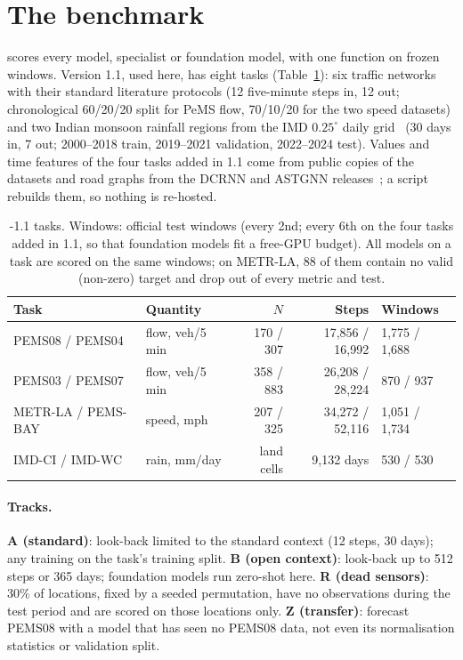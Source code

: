 \section{The \benchname{} benchmark}
\label{sec:bench}

\benchname{} scores every model, specialist or foundation model, with one function on frozen windows. Version
1.1, used here, has eight tasks (Table~\ref{tab:tasks}): six traffic networks with their standard literature
protocols (12 five-minute steps in, 12 out; chronological 60/20/20 split for PeMS flow, 70/10/20 for the two
speed datasets) and two Indian monsoon rainfall regions from the IMD $0.25^\circ$ daily grid~\citep{nandi2024imdlib}
(30 days in, 7 out; 2000--2018 train, 2019--2021 validation, 2022--2024 test). Values and time features of the
four tasks added in 1.1 come from public copies of the datasets and road graphs from the DCRNN and ASTGNN
releases~\citep{li2018dcrnn,guo2019astgcn}; a script rebuilds them, so nothing is re-hosted.

\begin{table}[t]
\caption{\benchname{}-1.1 tasks. Windows: official test windows (every 2nd; every 6th on the four tasks added in
1.1, so that foundation models fit a free-GPU budget). All models on a task are scored on the same windows; on METR-LA, 88 of them contain no valid (non-zero) target
and drop out of every metric and test.}
\label{tab:tasks}
\scriptsize
\setlength{\tabcolsep}{3pt}
\begin{tabular}{@{}llrrl@{}}
\toprule
Task & Quantity & $N$ & Steps & Windows \\
\midrule
PEMS08 / PEMS04 & flow, veh/5 min & 170 / 307 & 17,856 / 16,992 & 1,775 / 1,688 \\
PEMS03 / PEMS07 & flow, veh/5 min & 358 / 883 & 26,208 / 28,224 & 870 / 937 \\
METR-LA / PEMS-BAY & speed, mph & 207 / 325 & 34,272 / 52,116 & 1,051 / 1,734 \\
IMD-CI / IMD-WC & rain, mm/day & land cells & 9,132 days & 530 / 530 \\
\bottomrule
\end{tabular}
\end{table}

\paragraph{Tracks.} \textbf{A (standard)}: look-back limited to the standard context (12 steps, 30 days); any
training on the task's training split. \textbf{B (open context)}: look-back up to 512 steps or 365 days;
foundation models run zero-shot here. \textbf{R (dead sensors)}: 30\% of locations, fixed by a seeded
permutation, have no observations during the test period and are scored on those locations only.
\textbf{Z (transfer)}: forecast PEMS08 with a model that has seen no PEMS08 data, not even its normalisation
statistics or validation split.

